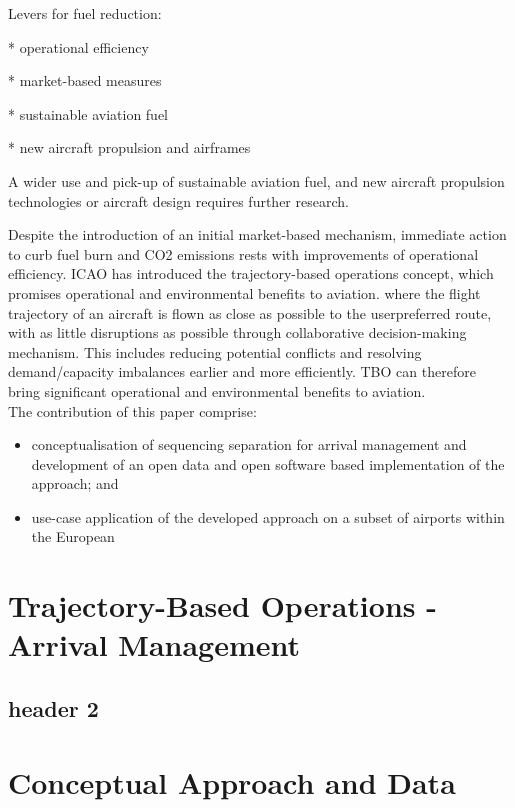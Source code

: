 \documentclass[letterpaper, 10 pt, journal, twoside]{IEEEtran}
\begin{document}
Levers for fuel reduction:

* operational efficiency

* market-based measures

* sustainable aviation fuel

* new aircraft propulsion and airframes

A wider use and pick-up of sustainable aviation fuel, and new aircraft
propulsion technologies or aircraft design requires further research.

Despite the introduction of an initial market-based mechanism, immediate
action to curb fuel burn and CO2 emissions rests with improvements of
operational efficiency. ICAO has introduced the trajectory-based
operations concept, which promises operational and environmental
benefits to aviation. where the flight trajectory of an aircraft is
flown as close as possible to the userpreferred route, with as little
disruptions as possible through collaborative decision-making mechanism.
This includes reducing potential conflicts and resolving demand/capacity
imbalances earlier and more efficiently. TBO can therefore bring
significant operational and environmental benefits to aviation.\\

The contribution of this paper comprise:

\begin{itemize}
\item
  conceptualisation of sequencing separation for arrival management and
  development of an open data and open software based implementation of
  the approach; and
\item
  use-case application of the developed approach on a subset of airports
  within the European
\end{itemize}

\hypertarget{trajectory-based-operations---arrival-management}{%
\section{Trajectory-Based Operations - Arrival
Management}\label{trajectory-based-operations---arrival-management}}

\hypertarget{header-2}{%
\subsection{header 2}\label{header-2}}

\hypertarget{conceptual-approach-and-data}{%
\section{Conceptual Approach and
Data}\label{conceptual-approach-and-data}}
\end{document}
